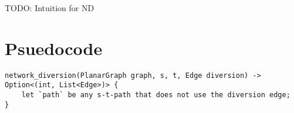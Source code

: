 TODO: Intuition for ND


\section{Psuedocode}
\begin{lstlisting}[caption={Main},label=Listing,mathescape=true]
network_diversion(PlanarGraph graph, s, t, Edge diversion) -> Option<(int, List<Edge>)> {
    let `path` be any s-t-path that does not use the diversion edge;
}
\end{lstlisting}
